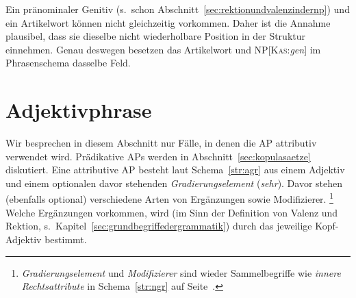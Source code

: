 \begin{exe}
  \ex\label{ex:adjektivphrasenundartikelwoerterindernp071}
  \begin{xlist}
  \end{xlist}
\end{exe}

Ein pränominaler Genitiv (s.\ schon Abschnitt~\ref{sec:rektionundvalenzindernp}) und ein Artikelwort können nicht gleichzeitig vorkommen.
Daher ist die Annahme plausibel, dass sie dieselbe nicht wiederholbare Position in der Struktur einnehmen.
Genau deswegen besetzen das Artikelwort und NP[\textsc{Kas}:\textit{gen}] im Phrasenschema dasselbe Feld.

\begin{exe}
  \ex\label{ex:adjektivphrasenundartikelwoerterindernp075}
  \begin{xlist}
  \end{xlist}
\end{exe}


\section{Adjektivphrase}
\label{sec:adjektivphrase}

Wir besprechen in diesem Abschnitt nur Fälle, in denen die AP attributiv verwendet wird.
Prädikative APs werden in Abschnitt~\ref{sec:kopulasaetze} diskutiert.
Eine attributive AP besteht laut Schema~\ref{str:agr} aus einem Adjektiv und einem optionalen davor stehenden \textit{Gradierungselement} (\zB \textit{sehr}).
Davor stehen (ebenfalls optional) verschiedene Arten von Ergänzungen sowie Modifizierer.%
\footnote{\textit{Gradierungselement} und \textit{Modifizierer} sind wieder Sammelbegriffe wie \textit{innere Rechtsattribute} in Schema~\ref{str:ngr} auf Seite~\pageref{str:ngr}.}
Welche Ergänzungen vorkommen, wird (im Sinn der Definition von Valenz und Rektion, s.\ Kapitel~\ref{sec:grundbegriffedergrammatik}) durch das jeweilige Kopf-Adjektiv bestimmt.

